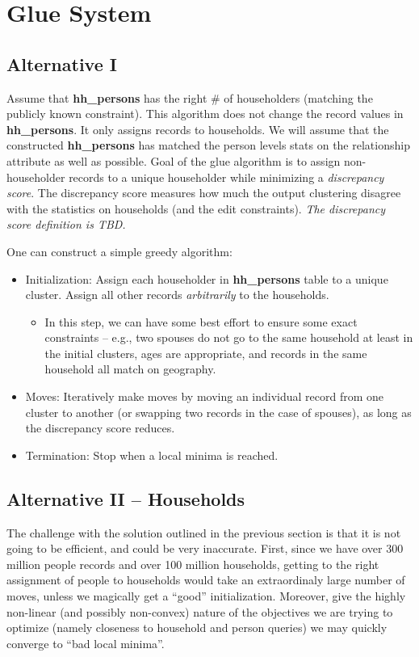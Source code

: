 \documentclass{amsart}
\begin{document}
{\section{Glue System}
\subsection{Alternative I}
Assume that \textbf{hh\_persons} has the right \# of householders (matching the publicly known constraint). This algorithm does not change the record values in \textbf{hh\_persons}. It only assigns records to households. We will assume that the constructed \textbf{hh\_persons} has matched the person levels stats on the relationship attribute as well as possible. 
Goal of the glue algorithm is to assign non-householder records to a unique householder while minimizing a \emph{discrepancy score}. The discrepancy score measures how much the output clustering disagree with the statistics on households (and the edit constraints). \emph{The discrepancy score definition is TBD.}

One can construct a simple greedy algorithm: 
\begin{itemize}
\item Initialization: Assign each householder in \textbf{hh\_persons} table to a unique cluster. Assign all other records \emph{arbitrarily} to the households.
\begin{itemize}
\item In this step, we can have some best effort to ensure some exact constraints  -- e.g., two spouses do not go to the same household at least in the initial clusters, ages are appropriate,  and records in the same household all match on geography. 
\end{itemize}
\item Moves: Iteratively make moves by moving an individual record from one cluster to another (or swapping two records in the case of spouses), as long as the discrepancy score reduces. 
\item Termination: Stop when a local minima is reached. 
\end{itemize}

\subsection{Alternative II -- Households}
The challenge with the solution outlined in the previous section is that it is not going to be efficient, and could be very inaccurate. First, since we have over 300 million people records and over 100 million households, getting to the right assignment of people to households would take an extraordinaly large number of moves, unless we magically get a ``good'' initialization. Moreover, give the highly non-linear (and possibly non-convex) nature of the objectives we are trying to optimize (namely closeness to household and person queries) we may quickly converge to ``bad local minima''. 

}
\end{document}
